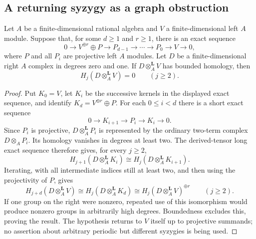 \subsection{A returning syzygy as a graph obstruction}

\begin{lemma}
\label{CP2:A-stable-syzygy-two-term-amplitude}
Let $A$ be a finite-dimensional rational algebra and $V$ a
finite-dimensional left $A$ module.  Suppose that, for some
$d\ge1$ and $r\ge1$, there is an exact sequence
\[
 0\longrightarrow V^{\oplus r}\oplus P
 \longrightarrow P_{d-1}\longrightarrow\cdots
 \longrightarrow P_0\longrightarrow V\longrightarrow0,
\]
where $P$ and all $P_i$ are projective left $A$ modules.
Let $D$ be a finite-dimensional right $A$ complex in degrees
zero and one.  If $D\otimes_A^{\mathbf L}V$ has bounded
homology, then
\[
 H_j(D\otimes_A^{\mathbf L}V)=0\qquad(j\ge2).
\]
\end{lemma}
\begin{proof}
Put $K_0=V$, let $K_i$ be the successive kernels in the
displayed exact sequence, and identify
$K_d=V^{\oplus r}\oplus P$.  For each $0\le i<d$ there
is a short exact sequence
\[
 0\longrightarrow K_{i+1}\longrightarrow P_i
                  \longrightarrow K_i\longrightarrow0.
\]
Since $P_i$ is projective, $D\otimes_A^{\mathbf L}P_i$
is represented by the ordinary two-term complex
$D\otimes_A P_i$.  Its homology vanishes in degrees at
least two.  The derived-tensor long exact sequence therefore
gives, for every $j\ge2$,
\[
 H_{j+1}(D\otimes_A^{\mathbf L}K_i)
       \cong H_j(D\otimes_A^{\mathbf L}K_{i+1}).
\]
Iterating, with all intermediate indices still at least two,
and then using the projectivity of $P$, gives
\[
 H_{j+d}(D\otimes_A^{\mathbf L}V)
   \cong H_j(D\otimes_A^{\mathbf L}K_d)
   \cong H_j(D\otimes_A^{\mathbf L}V)^{\oplus r}
                 \qquad(j\ge2).
\]
If one group on the right were nonzero, repeated use of this
isomorphism would produce nonzero groups in arbitrarily high
degrees.  Boundedness excludes this, proving the result.
The hypothesis returns to $V$ itself up to projective summands;
no assertion about arbitrary periodic but different syzygies is
being used.
\end{proof}

